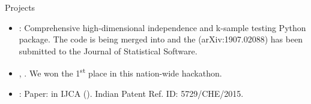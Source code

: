 \documentclass[]{mcdowellcv}
\begin{document}
	\begin{cvsection}{Projects}
		\begin{cvsubsection}{}{}{}
			\begin{itemize}
				\item \textbf{\href{https://github.com/neurodata/mgcpy}{}}: Comprehensive high-dimensional independence and k-sample testing Python package. The code is being merged into \href{https://github.com/scipy/scipy/pull/10524}{} and the \href{https://arxiv.org/abs/1907.02088}{} (arXiv:1907.02088) has been submitted to the Journal of Statistical Software.
				\item \textbf{\href{https://www.youtube.com/watch?v=iWw4_Ub2lPw&feature=youtu.be}{}}, \href{https://www.facebook.com/gtuoffice/videos/1786668221397028/?t=8798}{{}}. We won the 1\textsuperscript{st} place in this nation-wide hackathon.
				\item \textbf{\href{https://www.youtube.com/watch?v=O-L_uSHqQvQ}{}}: Paper: \href{http://research.ijcaonline.org/volume116/number11/pxc3902601.pdf}{} in IJCA (\href{https://www.researchgate.net/publication/275338025_Home_Automation_Systems_-_A_Study}{\color{blue!70}{cited 41 times}}). Indian Patent Ref. ID: 5729/CHE/2015.
			\end{itemize}
		\end{cvsubsection}
	\end{cvsection}
\end{document}
